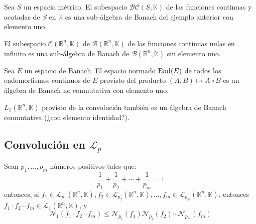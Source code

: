 \documentclass[12pt]{report}
\theoremstyle{largebreak}
\newcommand{\N}[2]{\ensuremath{\mathcal{N}_{#1}\left(#2\right)}}
\begin{document}
    \begin{exa}
        Sea $S$ un espacio métrico. El subespacio $\mathcal{BC}(S,\mathbb{K})$ de las funciones continuas y acotadas de $S$ en $\mathbb{K}$ es una sub-álgebra de Banach del ejemplo anterior con elemento uno.
    \end{exa}

    \begin{exa}
        El subespacio $\mathcal{C}(\mathbb{R}^n,\mathbb{K})$ de $\mathcal{B}(\mathbb{R}^n,\mathbb{K})$ de las funciones continuas nulas en infinito es una sub-álgebra de Banach de $\mathcal{B}(\mathbb{R}^n,\mathbb{K})$ sin elemento uno.
    \end{exa}

    \begin{exa}
        Sea $E$ un espacio de Banach. El espacio normado $\textup{End}(E)$ de todos los endomorfismos continuos de $E$ provisto del producto $(A,B)\mapsto A\circ B $ es un álgebra de Banach no conmutativa con elemento uno.
    \end{exa}

    \begin{exa}
        $L_1(\mathbb{R}^n,\mathbb{K})$ provisto de la convolución también es un álgebra de Banach conmutativa (¿con elemento identidad?).
    \end{exa}

    \subsection{Convolución en $\mathcal{L}_p$}

    \begin{theor}
        Sean $p_1,...,p_m$ números positivos tales que:
        \begin{equation*}
            \frac{1}{p_1}+\frac{1}{p_2}+\cdots+\frac{1}{p_m}=1
        \end{equation*}
        entonces, si $f_1\in\mathcal{L}_{p_1}(\mathbb{R}^n,\mathbb{K}),f_2\in\mathcal{L}_{p_2}(\mathbb{R}^n,\mathbb{K}),...,f_m\in\mathcal{L}_{p_m}(\mathbb{R}^n,\mathbb{K})$, entonces $f_1\cdot f_2\cdots f_m\in \mathcal{L}_1(\mathbb{R}^n,\mathbb{K})$, y
        \begin{equation*}
            \N{1}{f_1\cdot f_2\cdots f_m}\leq \N{p_1}{f_1}\N{p_2}{f_2}\cdots\N{p_m}{f_m}
        \end{equation*}
    \end{theor}
\end{document}
